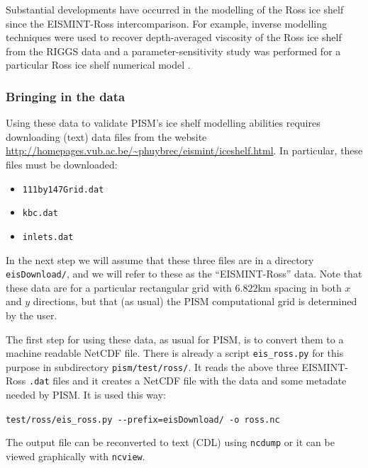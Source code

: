 \documentclass[11pt,final]{amsart}
\begin{document}
Substantial developments have occurred in the modelling of the Ross ice shelf since the EISMINT-Ross intercomparison.  For example, inverse modelling techniques were used to recover depth-averaged viscosity of the Ross ice shelf from the RIGGS data \cite{RommelaereMacAyeal} and a parameter-sensitivity study was performed for a particular Ross ice shelf numerical model \cite{HumbertGreveHutter}. 

\subsubsection{Bringing in the data}  Using these data to validate PISM's ice shelf modelling abilities requires downloading (text) data files from the website \url{http://homepages.vub.ac.be/~phuybrec/eismint/iceshelf.html}.  In particular, these files must be downloaded:
\begin{itemize}
\item \verb|111by147Grid.dat|
\item \verb|kbc.dat|
\item \verb|inlets.dat|
\end{itemize}
In the next step we will assume that these three files are in a directory \verb|eisDownload/|, and we will refer to these as the ``EISMINT-Ross'' data.  Note that these data are for a particular rectangular grid with $6.822$km spacing in both $x$ and $y$ directions, but that (as usual) the PISM computational grid is determined by the user.

The first step for using these data, as usual for PISM, is to convert them to a machine readable NetCDF file.  There is already a script \verb|eis_ross.py| for this purpose in subdirectory \verb|pism/test/ross/|.  It  reads the above three EISMINT-Ross \verb|.dat| files and it creates a NetCDF file with the data and some metadate needed by PISM.  It is used this way:

\verb|test/ross/eis_ross.py --prefix=eisDownload/ -o ross.nc|

\noindent The output file can be reconverted to text (CDL) using \verb|ncdump| or it can be viewed graphically with \verb|ncview|.
\end{document}

